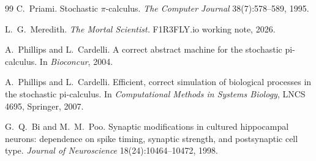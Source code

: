 \documentclass[11pt,a4paper]{article}
\theoremstyle{plain}
\theoremstyle{definition}
\theoremstyle{remark}
\begin{document}
\begin{thebibliography}{99}
 C.\ Priami. Stochastic $\pi$-calculus. \emph{The Computer Journal} 38(7):578--589,
1995.

 L.\ G.\ Meredith. \emph{The Mortal Scientist.} F1R3FLY.io working note, 2026.

 A.\ Phillips and L.\ Cardelli. A correct abstract machine for the stochastic
pi-calculus. In \emph{Bioconcur}, 2004.

 A.\ Phillips and L.\ Cardelli. Efficient, correct simulation of biological
processes in the stochastic pi-calculus. In \emph{Computational Methods in Systems Biology}, LNCS
4695, Springer, 2007.

 G.\ Q.\ Bi and M.\ M.\ Poo. Synaptic modifications in cultured hippocampal neurons:
dependence on spike timing, synaptic strength, and postsynaptic cell type. \emph{Journal of
Neuroscience} 18(24):10464--10472, 1998.

\end{thebibliography}
\end{document}
